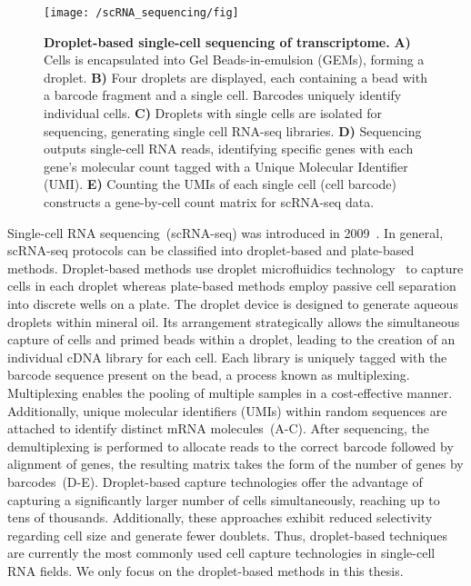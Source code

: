 \begin{figure}[!ht]
	\centering
	\texttt{[image: /scRNA\_sequencing/fig]}
	\vspace{0.1cm}
	\caption[Droplet-based single-cell sequencing of transcriptome.]{\textbf{Droplet-based single-cell sequencing of transcriptome.} \textbf{A)} Cells is encapsulated into Gel Beads-in-emulsion (GEMs), forming a droplet. \textbf{B)} Four droplets are displayed, each containing a bead with a barcode fragment and a single cell. Barcodes uniquely identify individual cells. \textbf{C)} Droplets with single cells are isolated for sequencing, generating single cell RNA-seq libraries. \textbf{D)} Sequencing outputs single-cell RNA reads, identifying specific genes with each gene's molecular count tagged with a Unique Molecular Identifier (UMI). \textbf{E)} Counting the UMIs of each single cell (cell barcode) constructs a gene-by-cell count matrix for scRNA-seq data.}
	\label{fig:scRNA_to_count_matrix}
\end{figure}


Single-cell RNA sequencing~(scRNA-seq) was introduced in 2009~\citep{tang2009mrna}. In general, scRNA-seq protocols can be classified into droplet-based and plate-based methods. Droplet-based methods use droplet microfluidics technology~\citep{dropletcompare2019, droplet2019practice} to capture cells in each droplet whereas plate-based methods employ passive cell separation into discrete wells on a plate. The droplet device is designed to generate aqueous droplets within mineral oil. Its arrangement strategically allows the simultaneous capture of cells and primed beads within a droplet, leading to the creation of an individual cDNA library for each cell. Each library is uniquely tagged with the barcode sequence present on the bead, a process known as multiplexing. Multiplexing enables the pooling of multiple samples in a cost-effective manner. Additionally, unique molecular identifiers (UMIs) within random sequences are attached to identify distinct mRNA molecules~(A-C). After sequencing, the demultiplexing is performed to allocate reads to the correct barcode followed by alignment of genes, the resulting matrix takes the form of the number of genes by barcodes~(D-E). Droplet-based capture technologies offer the advantage of capturing a significantly larger number of cells simultaneously, reaching up to tens of thousands. Additionally, these approaches exhibit reduced selectivity regarding cell size and generate fewer doublets. Thus, droplet-based techniques are currently the most commonly used cell capture technologies in single-cell RNA fields. We only focus on the droplet-based methods in this thesis.



